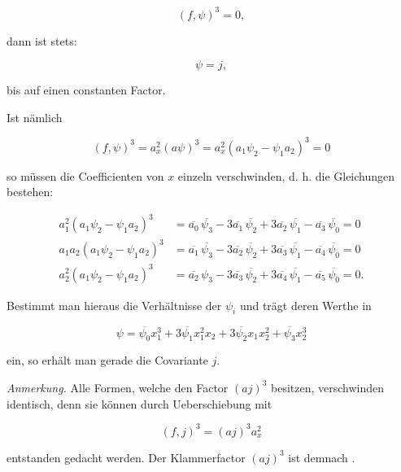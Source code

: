 \documentclass[11pt]{article}
\providecommand{\gesperrt}[1]{\textls[130]{#1}}
\providecommand{\weberpage}[1]{}
\begin{document}
\[ (f, \psi)^3 = 0, \]

dann ist stets:

\[ \psi = j, \]

bis auf einen constanten Factor.

Ist nämlich

\[ (f, \psi)^3 = a_x^2 (a\psi)^3 = a_x^2 (a_1 \psi_2 - \psi_1 a_2)^3 = 0 \]


\weberpage{243}

so müssen die Coefficienten von $x$ einzeln verschwinden, d. h.
die Gleichungen bestehen:

\[
\begin{aligned}
a_1^2 (a_1 \psi_2 - \psi_1 a_2)^3 &= \overline{a_0}\, \overline{\psi_3} - 3 \overline{a_1}\, \overline{\psi_2} + 3 \overline{a_2}\, \overline{\psi_1} - \overline{a_3}\, \overline{\psi_0} = 0 \\
a_1 a_2 (a_1 \psi_2 - \psi_1 a_2)^3 &= \overline{a_1}\, \overline{\psi_3} - 3 \overline{a_2}\, \overline{\psi_2} + 3 \overline{a_3}\, \overline{\psi_1} - \overline{a_4}\, \overline{\psi_0} = 0 \\
a_2^2 (a_1 \psi_2 - \psi_1 a_2)^3 &= \overline{a_2}\, \psi_3 - 3 \overline{a_3}\, \overline{\psi_2} + 3 \overline{a_4}\, \overline{\psi_1} - \overline{a_5}\, \overline{\psi_0} = 0. %
\end{aligned}
\]

Bestimmt man hieraus die Verhältnisse der $\psi_i$ und trägt deren
Werthe in

\[ \psi = \overline{\psi_0} x_1^3 + 3 \overline{\psi_1} x_1^2 x_2 + 3 \overline{\psi_2} x_1 x_2^2 + \overline{\psi_3} x_2^3 \]

ein, so erhält man gerade die Covariante $j$.

\textit{Anmerkung.} Alle Formen, welche den Factor $(aj)^3$ besitzen, verschwinden
 identisch, denn sie können durch Ueberschiebung mit

\[ (f, j)^3 = (aj)^3 a_x^2 \]

entstanden gedacht werden. Der Klammerfactor $(aj)^3$ ist demnach
\gesperrt{Reducent}.
\end{document}

